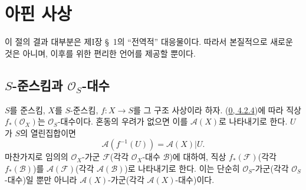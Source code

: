 \setcounter{section}{0}
\section{아핀 사상}
\label{section:II.1-ko}

이 절의 결과 대부분은 제I장 \S~1의 ``전역적'' 대응물이다. 따라서
본질적으로 새로운 것은 아니며, 이후를 위한 편리한 언어를 제공할 뿐이다.

\setcounter{subsection}{0}
\subsection{$S$-준스킴과 $\mathcal{O}_S$-대수}
\label{subsection:II.1.1-ko}

\begin{env}[1.1.1]
\label{II.1.1.1-ko}
$S$를 준스킴, $X$를 $S$-준스킴, $f:X\to S$를 그 구조 사상이라 하자.
(\hyperref[0.4.2.4-ko]{0, 4.2.4})에 따라 직상
$f_*(\mathcal{O}_X)$는 $\mathcal{O}_S$-대수이다. 혼동의 우려가 없으면
이를
$\mathcal{A}(X)$로 나타내기로 한다. $U$가 $S$의 열린집합이면
\[
  \mathcal{A}(f^{-1}(U))=\mathcal{A}(X)|U.
\]
마찬가지로 임의의 $\mathcal{O}_X$-가군 $\mathcal{F}$(각각
$\mathcal{O}_X$-대수 $\mathcal{B}$)에 대하여, 직상
$f_*(\mathcal{F})$(각각 $f_*(\mathcal{B})$)를
$\mathcal{A}(\mathcal{F})$(각각 $\mathcal{A}(\mathcal{B})$)로
나타내기로 한다. 이는 단순히 $\mathcal{O}_S$-가군(각각
$\mathcal{O}_S$-대수)일 뿐만 아니라 $\mathcal{A}(X)$-가군(각각
$\mathcal{A}(X)$-대수)이다.
\end{env}

